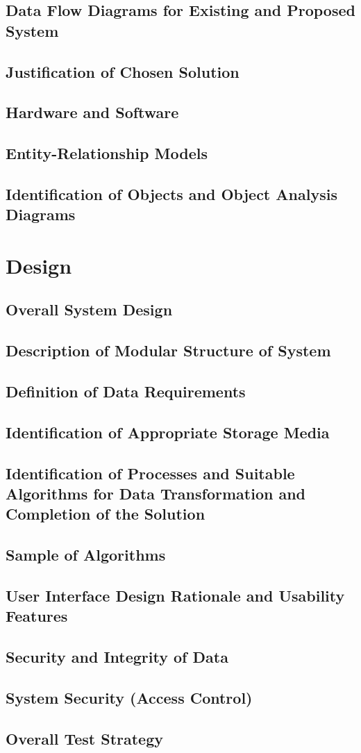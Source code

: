 \documentclass[11pt]{article}
\begin{document}
        \subsection{Data Flow Diagrams for Existing and Proposed System}
        \subsection{Justification of Chosen Solution}
        \subsection{Hardware and Software}
        \subsection{Entity-Relationship Models}
        \subsection{Identification of Objects and Object Analysis Diagrams}

    \section{Design}
        \subsection{Overall System Design}
        \subsection{Description of Modular Structure of System}
        \subsection{Definition of Data Requirements}
        \subsection{Identification of Appropriate Storage Media}
        \subsection{Identification of Processes and Suitable Algorithms for Data Transformation and Completion of the Solution}
        \subsection{Sample of Algorithms}
        \subsection{User Interface Design Rationale and Usability Features}
        \subsection{Security and Integrity of Data}
        \subsection{System Security (Access Control)}
        \subsection{Overall Test Strategy}
        
\end{document}
